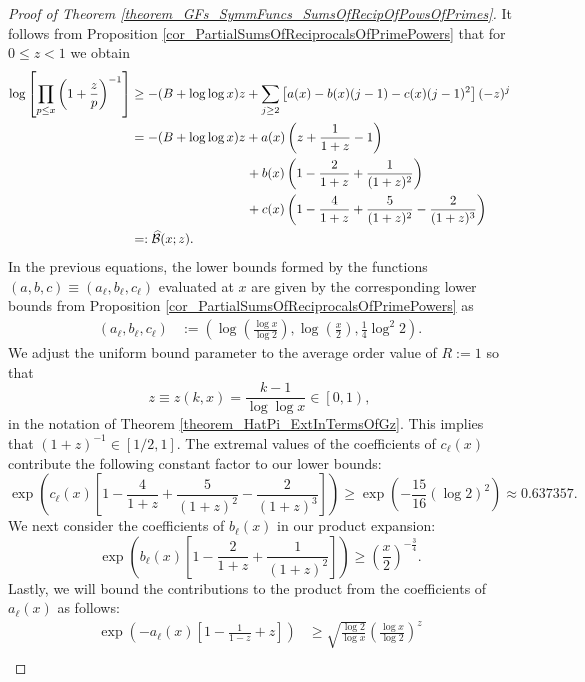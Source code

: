 \documentclass[11pt,reqno,a4letter]{article}
\numberwithin{figure}{section}
\numberwithin{table}{section}
\theoremstyle{plain}
\numberwithin{theorem}{section}
\theoremstyle{definition}
\begin{document}
\begin{proof}[Proof of Theorem \ref{theorem_GFs_SymmFuncs_SumsOfRecipOfPowsOfPrimes}]
It follows from Proposition \ref{cor_PartialSumsOfReciprocalsOfPrimePowers} that 
for $0 \leq z < 1$ we obtain 
\begin{align} 
\notag 
\log\left[\prod_{p \leq x} \left(1+\frac{z}{p}\right)^{-1}\right] & \geq -(B + \log\log x) z + 
     \sum_{j \geq 2} \left[a(x) - b(x)(j-1) - c(x) (j-1)^2\right] (-z)^j \\ 
\notag 
     & = -(B + \log\log x) z + a(x) \left(z + \frac{1}{1+z} - 1\right) \\ 
\notag 
     & \phantom{= -(B + \log\log x) z\ } + 
     b(x) \left( 
     1 - \frac{2}{1+z} + \frac{1}{(1+z)^2}\right) \\ 
\notag 
     & \phantom{= -(B + \log\log x) z\ } + 
     c(x) \left( 
     1 - \frac{4}{1+z} + \frac{5}{(1+z)^2} - \frac{2}{(1+z)^3}\right) \\ 
\label{eqn_proof_tag_PHatFiniteTruncProdFactorOfGz_v3} 
     & =: \widehat{\mathcal{B}}(x; z). 
\end{align} 
In the previous equations, the lower bounds formed by the functions 
$(a,b,c) \equiv (a_{\ell}, b_{\ell}, c_{\ell})$ 
evaluated at $x$ are given by the corresponding lower bounds from 
Proposition \ref{cor_PartialSumsOfReciprocalsOfPrimePowers} as 
\begin{align*} 
(a_{\ell}, b_{\ell}, c_{\ell}) & := \left(\log\left(\frac{\log x}{\log 2}\right), 
     \log\left(\frac{x}{2}\right), \frac{1}{4} \log^2 2\right). 
\end{align*} 
We adjust the uniform bound parameter to the average order value of 
$R := 1$ so that 
$$z \equiv z(k, x) = \frac{k-1}{\log\log x} \in \left[0, 1\right),$$ 
in the notation of Theorem \ref{theorem_HatPi_ExtInTermsOfGz}. 
This implies that $(1+z)^{-1} \in \left[1/2, 1\right]$. 
The extremal values of the coefficients of $c_{\ell}(x)$ 
contribute the following constant factor to our lower bounds: 
\[
\exp\left(c_{\ell}(x) \left[ 
     1 - \frac{4}{1+z} + \frac{5}{(1+z)^2} - \frac{2}{(1+z)^3} 
     \right]\right) \geq \exp\left(-\frac{15}{16} (\log 2)^2\right) 
     \approx 0.637357. 
\]
We next consider the coefficients of $b_{\ell}(x)$ in our product expansion: 
\[
\exp\left(b_{\ell}(x) \left[1 - \frac{2}{1+z} + \frac{1}{(1+z)^2}\right]\right) 
     \geq \left(\frac{x}{2}\right)^{-\frac{3}{4}}. 
\]
Lastly, we will bound the contributions to the product from the coefficients of 
$a_{\ell}(x)$ as follows: 
\begin{align*} 
\exp\left(-a_{\ell}(x) \left[1 - \frac{1}{1-z} + z\right]\right) & \geq 
     \sqrt{\frac{\log 2}{\log x}} 
     \left(\frac{\log x}{\log 2}\right)^{z} \\ 

\end{align*}
\end{proof}
\end{document}

